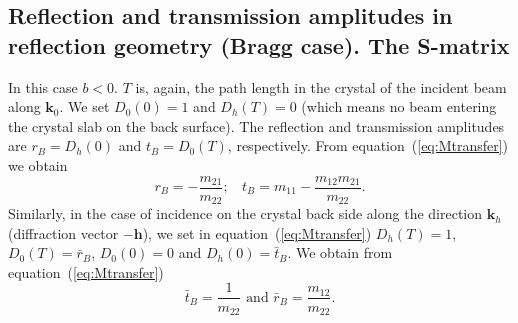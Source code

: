 \documentclass[preprint]{iucr}              %
\begin{document}
\subsection{Reflection and transmission amplitudes in reflection geometry (Bragg case). The S-matrix}
\label{sec:TTsolutionsBragg}

In this case $b<0$. $T$ is, again, the path length in the crystal of the incident beam along $\textbf{k}_0$.
We set $D_0(0)=1$ and $D_h(T)=0$ (which means no beam entering the crystal slab on the back surface). The reflection and transmission amplitudes are
$r_B=D_h(0)$ and $t_B=D_0(T)$, respectively. From equation~(\ref{eq:Mtransfer}) we obtain
\begin{equation}\label{eq:braggrandtvsm}
    r_B = -\frac{m_{21}}{m_{22}}; ~~~~ t_B = m_{11}-\frac{m_{12} m_{21}}{m_{22}}.
\end{equation}
Similarly, in the case of incidence on the crystal back side along the direction $\textbf{k}_h$ (diffraction vector $-\textbf{h}$), we set in equation~(\ref{eq:Mtransfer}) $D_h(T)=1$, $D_0(T)=\bar{r}_B$, $D_0(0)=0$ and $D_h(0)=\bar{t}_B$. We obtain from equation~(\ref{eq:Mtransfer})
\begin{equation}\label{eq:braggtbarandrbar}
    \bar{t}_B = \frac{1}{m_{22}} \text{ and } \bar{r}_B = \frac{m_{12}}{m_{22}}.
\end{equation}
\end{document}
